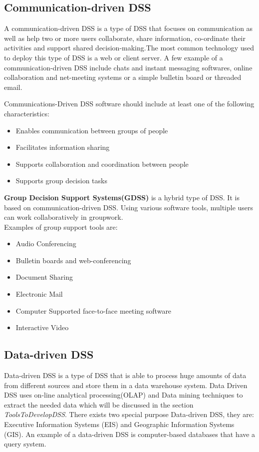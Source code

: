 \subsection{Communication-driven DSS}
\label{subsec:CommunicationDrivenDSS}
\indent A communication-driven DSS is a type of DSS that focuses on communication as well as help two or more users collaborate, share information, co-ordinate their activities and support shared decision-making.\cite{DDSTypes}The most common technology used to deploy this type of DSS is a web or client server. A few example of a communication-driven DSS include chats and instant messaging softwares, online collaboration and net-meeting systems or a simple bulletin board or threaded email.

\indent Communications-Driven DSS software should include at least one of the following characteristics:
\begin{itemize}
	\itemsep0em 
	\item Enables communication between groups of people
	\item Facilitates information sharing
	\item Supports collaboration and coordination between people
	\item Supports group decision tasks
\end{itemize}
\textbf{Group Decision Support Systems(GDSS)} is a hybrid type of DSS. It is based on communication-driven DSS. Using various software tools, multiple users can work collaboratively in groupwork.\cite{DDSTypes}\\
Examples of group support tools are: 
\begin{itemize}
	\itemsep0em 
	\item Audio Conferencing
	\item Bulletin boards and web-conferencing
	\item Document Sharing
	\item Electronic Mail
	\item Computer Supported face-to-face meeting software 
	\item Interactive Video
\end{itemize}
\subsection{Data-driven DSS}
\label{subsec:DataDrivenDSS}
\indent Data-driven DSS is a type of DSS that is able to process huge amounts of data from different sources and store them in a data warehouse system. Data Driven DSS uses on-line analytical processing(OLAP) and Data mining techniques to extract the needed data which will be discussed in the section \textit{ToolsToDevelopDSS}. There exists two special purpose Data-driven DSS, they are: Executive Information Systems (EIS) and Geographic Information Systems (GIS). An example of a data-driven DSS is computer-based databases that have a query system.

